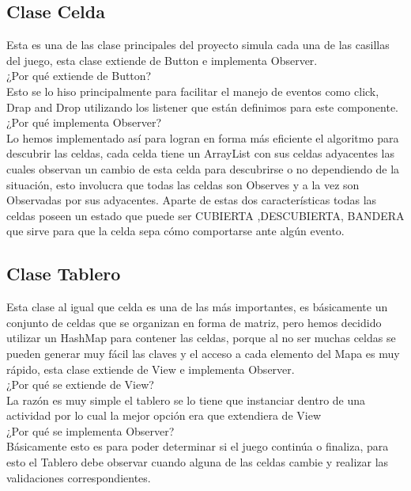 \documentclass[11pt]{article} %
\begin{document}
\subsection{Clase Celda}
Esta es una de las clase principales del proyecto simula cada una de las casillas del juego, esta clase extiende de Button e implementa Observer.\\
¿Por qué extiende de Button?\\
Esto se lo hiso principalmente para facilitar el manejo de eventos como click, Drap and Drop utilizando los listener que están definimos para este componente.\\
¿Por qué implementa Observer?\\
Lo hemos implementado así para logran en forma más eficiente el algoritmo para descubrir las celdas, cada celda tiene un ArrayList con sus celdas adyacentes las cuales observan un cambio de esta celda para descubrirse o no dependiendo de la situación, esto involucra que todas las celdas son Observes y a la vez son Observadas por sus adyacentes.
Aparte de estas dos características todas las celdas poseen un estado que puede ser CUBIERTA ,DESCUBIERTA, BANDERA que sirve para que la celda sepa cómo comportarse ante algún evento.\\

\subsection{Clase Tablero}
Esta clase al igual que celda es una de las más importantes, es básicamente un conjunto de celdas que se organizan en forma de matriz, pero hemos decidido utilizar un HashMap para contener las celdas, porque al no ser muchas celdas se pueden generar muy fácil las claves y el acceso a cada elemento del Mapa es muy rápido, esta clase extiende de View e implementa Observer.\\
¿Por qué se extiende de View?\\
La razón es muy simple el tablero se lo tiene que instanciar dentro de una actividad por lo cual la mejor opción era que extendiera de View\\
¿Por qué se implementa Observer?\\
Básicamente esto es para poder determinar si el juego continúa o finaliza, para esto el Tablero debe observar cuando alguna de las celdas cambie y realizar las validaciones correspondientes.\\
\end{document}
